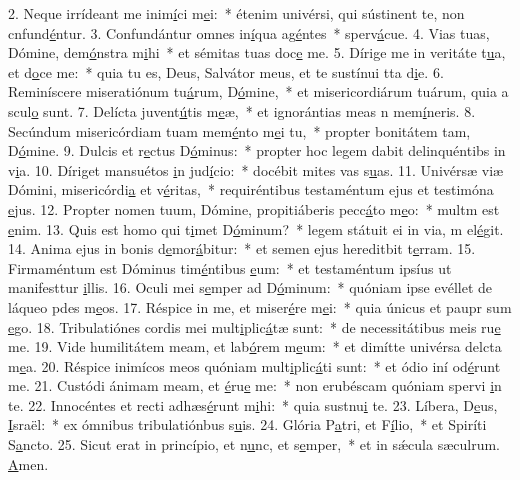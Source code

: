 2. Neque irrídeant me inim\uline{í}ci m\uline{e}i:~* étenim univérsi, qui sústinent te, non cnfund\uline{é}ntur.
3. Confundántur omnes in\uline{í}qua ag\uline{é}ntes~* sperv\uline{á}cue.
4. Vias tuas, Dómine, dem\uline{ó}nstra m\uline{i}hi~* et sémitas tuas doc\uline{e} me.
5. Dírige me in veritáte t\uline{u}a, et d\uline{o}ce me:~* quia tu es, Deus, Salvátor meus, et te sustínui tta d\uline{i}e.
6. Reminíscere miseratiónum tu\uline{á}rum, D\uline{ó}mine,~* et misericordiárum tuárum, quia a scul\uline{o} sunt.
7. Delícta juvent\uline{ú}tis m\uline{e}æ,~* et ignorántias meas n mem\uline{í}neris.
8. Secúndum misericórdiam tuam mem\uline{é}nto m\uline{e}i tu,~* propter bonitátem tam, D\uline{ó}mine.
9. Dulcis et r\uline{e}ctus D\uline{ó}minus:~* propter hoc legem dabit delinquéntibs in v\uline{i}a.
10. Díriget mansuétos \uline{i}n jud\uline{í}cio:~* docébit mites vas s\uline{u}as.
11. Univérsæ viæ Dómini, misericórdi\uline{a} et v\uline{é}ritas,~* requiréntibus testaméntum ejus et testimóna \uline{e}jus.
12. Propter nomen tuum, Dómine, propitiáberis pecc\uline{á}to m\uline{e}o:~* multm est \uline{e}nim.
13. Quis est homo qui t\uline{i}met D\uline{ó}minum?~* legem státuit ei in via, m el\uline{é}git.
14. Anima ejus in bonis d\uline{e}mor\uline{á}bitur:~* et semen ejus hereditbit t\uline{e}rram.
15. Firmaméntum est Dóminus tim\uline{é}ntibus \uline{e}um:~* et testaméntum ipsíus ut manifesttur \uline{i}llis.
16. Oculi mei s\uline{e}mper ad D\uline{ó}minum:~* quóniam ipse evéllet de láqueo pdes m\uline{e}os.
17. Réspice in me, et miser\uline{é}re m\uline{e}i:~* quia únicus et paupr sum \uline{e}go.
18. Tribulatiónes cordis mei mult\uline{i}plic\uline{á}tæ sunt:~* de necessitátibus meis ru\uline{e} me.
19. Vide humilitátem meam, et lab\uline{ó}rem m\uline{e}um:~* et dimítte univérsa delcta m\uline{e}a.
20. Réspice inimícos meos quóniam mult\uline{i}plic\uline{á}ti sunt:~* et ódio iní od\uline{é}runt me.
21. Custódi ánimam meam, et \uline{é}ru\uline{e} me:~* non erubéscam quóniam spervi \uline{i}n te.
22. Innocéntes et recti adhæs\uline{é}runt m\uline{i}hi:~* quia sustnu\uline{i} te.
23. Líbera, D\uline{e}us, \uline{I}sraël:~* ex ómnibus tribulatiónbus s\uline{u}is.
24. Glória P\uline{a}tri, et F\uline{í}lio,~* et Spiríti S\uline{a}ncto.
25. Sicut erat in princípio, et n\uline{u}nc, et s\uline{e}mper,~* et in sǽcula sæculrum. \uline{A}men.
